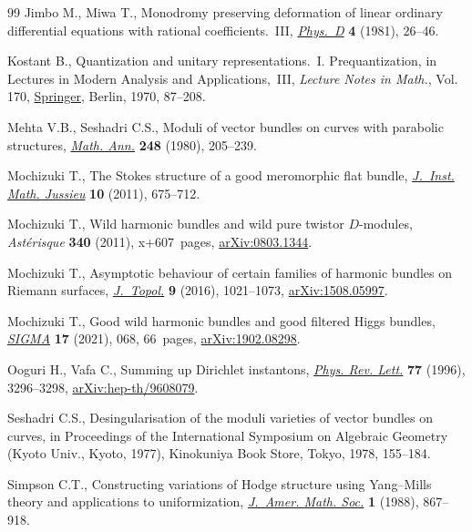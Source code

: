 \documentclass[11pt]{article}
\numberwithin{equation}{section}
\numberwithin{equation}{section}
\begin{document}
\begin{thebibliography}{99}
Jimbo M., Miwa T., Monodromy preserving deformation of linear ordinary
 differential equations with rational coefficients.~{III}, \href{https://doi.org/10.1016/0167-2789(81)90003-8}{\textit{Phys.~D}}
 \textbf{4} (1981), 26--46.

Kostant B., Quantization and unitary representations.~{I}. {P}requantization,
 in Lectures in {M}odern {A}nalysis and {A}pplications,~{III}, \textit{Lecture
 Notes in Math.}, Vol. 170, \href{https://doi.org/10.1007/BFb0079068}{Springer}, Berlin, 1970, 87--208.

Mehta V.B., Seshadri C.S., Moduli of vector bundles on curves with parabolic
 structures, \href{https://doi.org/10.1007/BF01420526}{\textit{Math. Ann.}} \textbf{248} (1980), 205--239.

Mochizuki T., The {S}tokes structure of a good meromorphic flat bundle,
 \href{https://doi.org/10.1017/S1474748011000065}{\textit{J.~Inst. Math. Jussieu}} \textbf{10} (2011), 675--712.

Mochizuki T., Wild harmonic bundles and wild pure twistor {$D$}-modules,
 \textit{Ast\'erisque} \textbf{340} (2011), x+607~pages, \href{https://arxiv.org/abs/0803.1344}{arXiv:0803.1344}.

Mochizuki T., Asymptotic behaviour of certain families of harmonic bundles on
 {R}iemann surfaces, \href{https://doi.org/10.1112/jtopol/jtw018}{\textit{J.~Topol.}} \textbf{9} (2016), 1021--1073,
 \href{https://arxiv.org/abs/1508.05997}{arXiv:1508.05997}.

Mochizuki T., Good wild harmonic bundles and good filtered {H}iggs bundles,
 \href{https://doi.org/10.3842/SIGMA.2021.068}{\textit{SIGMA}} \textbf{17} (2021), 068, 66~pages, \href{https://arxiv.org/abs/1902.08298}{arXiv:1902.08298}.

Ooguri H., Vafa C., Summing up {D}irichlet instantons, \href{https://doi.org/10.1103/PhysRevLett.77.3296}{\textit{Phys. Rev.
 Lett.}} \textbf{77} (1996), 3296--3298, \href{https://arxiv.org/abs/hep-th/9608079}{arXiv:hep-th/9608079}.

Seshadri C.S., Desingularisation of the moduli varieties of vector bundles on
 curves, in Proceedings of the {I}nternational {S}ymposium on {A}lgebraic
 {G}eometry ({K}yoto {U}niv., {K}yoto, 1977), Kinokuniya Book Store, Tokyo,
 1978, 155--184.

Simpson C.T., Constructing variations of {H}odge structure using
 {Y}ang--{M}ills theory and applications to uniformization, \href{https://doi.org/10.2307/1990994}{\textit{J.~Amer.
 Math. Soc.}} \textbf{1} (1988), 867--918.


\end{thebibliography}
\end{document}
